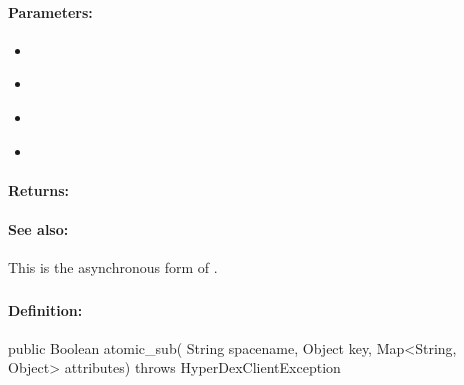 \paragraph{Parameters:}
\begin{itemize}[noitemsep]
\item {}\\

\item {}\\

\item {}\\

\item {}\\

\end{itemize}

\paragraph{Returns:}


\paragraph{See also:}  This is the asynchronous form of .

\pagebreak
\subsubsection{}
\label{api:java:atomic_sub}


\paragraph{Definition:}
\begin{javacode}
public Boolean atomic_sub(
        String spacename,
        Object key,
        Map<String, Object> attributes) throws HyperDexClientException
\end{javacode}

